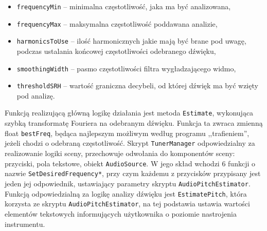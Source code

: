 \begin{itemize}
    \item \texttt{frequencyMin} -- minimalna częstotliwość, jaka ma być analizowana,
    \item \texttt{frequencyMax} -- maksymalna częstotliwość poddawana analizie,
    \item \texttt{harmonicsToUse} -- ilość harmonicznych jakie mają być brane pod uwagę, podczas ustalania końcowej częstotliwości odebranego dźwięku,
    \item \texttt{smoothingWidth} -- pasmo częstotliwości filtra wygładzającego widmo,
    \item \texttt{thresholdSRH} -- wartość graniczna decybeli, od której dźwięk ma być wzięty pod analizę.
\end{itemize}

Funkcją realizującą główną logikę działania jest metoda \texttt{Estimate}, wykonująca szybką transformatę Fouriera na odebranym dźwięku. Funkcja ta zwraca zmienną float \texttt{bestFreq}, będąca najlepszym możliwym według programu ,,trafieniem'', jeżeli chodzi o odebraną częstotliwość. Skrypt \texttt{TunerManager} odpowiedzialny za realizowanie logiki sceny, przechowuje odwołania do komponentów sceny: przyciski, pola tekstowe, obiekt \texttt{AudioSource}. W jego skład wchodzi 6 funkcji o nazwie \texttt{SetDesiredFrequency*}, przy czym każdemu z przycisków przypisany jest jeden jej odpowiednik, ustawiający parametry skryptu \texttt{AudioPitchEstimator}. Funkcją odpowiedzialną za logikę analizy dźwięku jest \texttt{EstimatePitch}, która korzysta ze skryptu \texttt{AudioPitchEstimator}, na tej podstawia ustawia wartości elementów tekstowych informujących użytkownika o poziomie nastrojenia instrumentu. 

